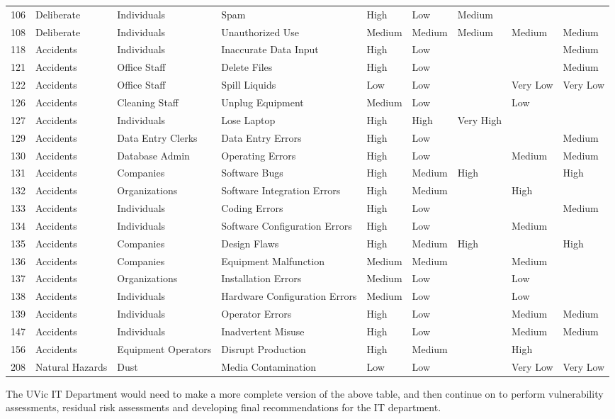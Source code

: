 \documentclass{article}
\numberwithin{equation}{section} %
\numberwithin{figure}{section} %
\numberwithin{table}{section} %
\begin{document}
\begin{center}
\begin{adjustwidth}{-4.3cm}{}
\begin{tabular}{ l | l | l | l | l | l | l | l | l}
    106 & Deliberate & Individuals & Spam & High & Low & Medium &  &  \\
    108 & Deliberate & Individuals & Unauthorized Use & Medium & Medium & Medium & Medium & Medium \\
    118 & Accidents & Individuals & Inaccurate Data Input & High & Low &  &  & Medium \\
    121 & Accidents & Office Staff & Delete Files & High & Low &  &  & Medium \\
    122 & Accidents & Office Staff & Spill Liquids & Low & Low &  & Very Low & Very Low \\
    126 & Accidents & Cleaning Staff & Unplug Equipment & Medium & Low &  & Low &  \\
    127 & Accidents & Individuals & Lose Laptop & High & High & Very High &  &  \\
    129 & Accidents & Data Entry Clerks & Data Entry Errors & High & Low &  &  & Medium \\
    130 & Accidents & Database Admin & Operating Errors & High & Low &  & Medium & Medium \\
    131 & Accidents & Companies & Software Bugs & High & Medium & High &  & High \\
    132 & Accidents & Organizations & Software Integration Errors & High & Medium &  & High &  \\
    133 & Accidents & Individuals & Coding Errors & High & Low &  &  & Medium \\
    134 & Accidents & Individuals & Software Configuration Errors & High & Low &  & Medium &  \\
    135 & Accidents & Companies & Design Flaws & High & Medium & High &  & High \\
    136 & Accidents & Companies & Equipment Malfunction & Medium & Medium &  & Medium &  \\
    137 & Accidents & Organizations & Installation Errors & Medium & Low &  & Low &  \\
    138 & Accidents & Individuals & Hardware Configuration Errors & Medium & Low &  & Low &  \\
    139 & Accidents & Individuals & Operator Errors & High & Low &  & Medium & Medium \\
    147 & Accidents & Individuals & Inadvertent Misuse & High & Low &  & Medium & Medium \\
    156 & Accidents & Equipment Operators & Disrupt Production & High & Medium &  & High &  \\
    208 & Natural Hazards & Dust & Media Contamination & Low & Low &  & Very Low & Very Low \\
    \hline
    \end{tabular}
\end{adjustwidth}
\end{center}
\normalsize
The UVic IT Department would need to make a more complete version of the above table, and then continue on to perform vulnerability assessments, residual risk assessments and developing final recommendations for the IT department.
 

\end{document}
